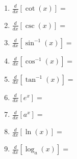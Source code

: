 \documentclass[11pt,fleqn]{article}
\begin{document}
\begin{enumerate}
\begin{multicols}{2}
\begin{enumerate}
	\item $\displaystyle{\frac{d}{dx} \left[ \cot(x) \right]=}$
	\item $\displaystyle{\frac{d}{dx} \left[ \csc(x)\right]=}$
	\item $\displaystyle{\frac{d}{dx} \left[ \sin^{-1}(x)\right]=}$
	\item $\displaystyle{\frac{d}{dx} \left[ \cos^{-1}(x)\right]=}$
	\item $\displaystyle{\frac{d}{dx} \left[ \tan^{-1}(x) \right]=}$
	\item $\displaystyle{\frac{d}{dx} \left[ e^x\right]=}$
	\item $\displaystyle{\frac{d}{dx} \left[ a^x\right]=}$
	\item $\displaystyle{\frac{d}{dx} \left[ \ln(x)\right]=}$
	\item $\displaystyle{\frac{d}{dx} \left[ \log_a(x)\right]=}$
	\end{enumerate}
\end{multicols}

\end{enumerate}
\end{document}
